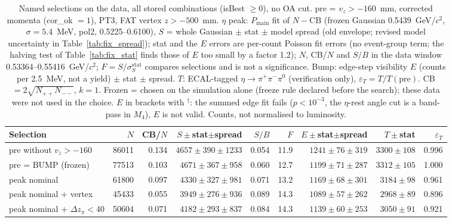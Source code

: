 \begin{table}[H]
\centering\footnotesize
\setlength{\tabcolsep}{3pt}
\caption{Named selections on the data, all stored combinations (isBest $\geq 0$), no OA cut. pre = $v_z>-160$~mm, corrected momenta (cor\_ok $=1$), PT3, FAT vertex $z>-500$~mm. $\eta$ peak: $P_\mathrm{main}$ fit of $N-\mathrm{CB}$ (frozen Gaussian 0.5439~GeV/$c^2$, $\sigma=5.4$~MeV, pol2, 0.5225--0.6100), $S$ = whole Gaussian $\pm$ stat $\pm$ model spread (old envelope; revised model uncertainty in Table~\ref{tab:fix_spread}); stat and the $E$ errors are per-count Poisson fit errors (no event-group term; the halving test of Table~\ref{tab:fix_stat} finds those of $E$ too small by a factor 1.2); $N$, CB/$N$ and $S/B$ in the data window 0.53364--0.55416~GeV/$c^2$; $F=S/\sigma_S^\mathrm{stat}$ compares selections and is not a significance. Bump: edge-step visibility $E$ (counts per 2.5~MeV, not a yield) $\pm$ stat $\pm$ spread. $T$: ECAL-tagged $\eta\to\pi^+\pi^-\pi^0$ (verification only), $\varepsilon_T=T/T(\mathrm{pre})$. CB $=2\sqrt{N_{++}N_{--}}$, $k=1$. Frozen = chosen on the simulation alone (freeze rule declared before the search); these data were not used in the choice. $E$ in brackets with $^\dagger$: the summed edge fit fails ($p<10^{-3}$, the $\eta$-rest angle cut is a band-pass in $M_4$), $E$ is not valid. Counts, not normalised to luminosity.}
\label{tab:opt_named}
\begin{tabular}{lrrrrrrrr}
\toprule
Selection & $N$ & CB/$N$ & $S\pm$stat$\pm$spread & $S/B$ & $F$ & $E\pm$stat$\pm$spread & $T\pm$stat & $\varepsilon_T$ \\
\midrule
pre without $v_z>-160$ & 86011 & 0.134 & $4657\pm390\pm1233$ & 0.054 & 11.9 & $1241\pm76\pm319$ & $3300\pm108$ & 0.996 \\
\midrule
pre = BUMP (frozen) & 77513 & 0.103 & $4671\pm367\pm958$ & 0.060 & 12.7 & $1199\pm71\pm287$ & $3312\pm105$ & 1.000 \\
peak nominal & 61800 & 0.097 & $4330\pm327\pm981$ & 0.071 & 13.2 & $1169\pm68\pm301$ & $3184\pm98$ & 0.961 \\
peak nominal + vertex & 45433 & 0.055 & $3949\pm276\pm936$ & 0.089 & 14.3 & $1089\pm57\pm262$ & $2968\pm89$ & 0.896 \\
peak nominal + $\Delta z_\pi<40$ & 50604 & 0.071 & $4182\pm293\pm837$ & 0.084 & 14.3 & $1139\pm60\pm253$ & $3050\pm91$ & 0.921 \\

\end{tabular}
\end{table}
